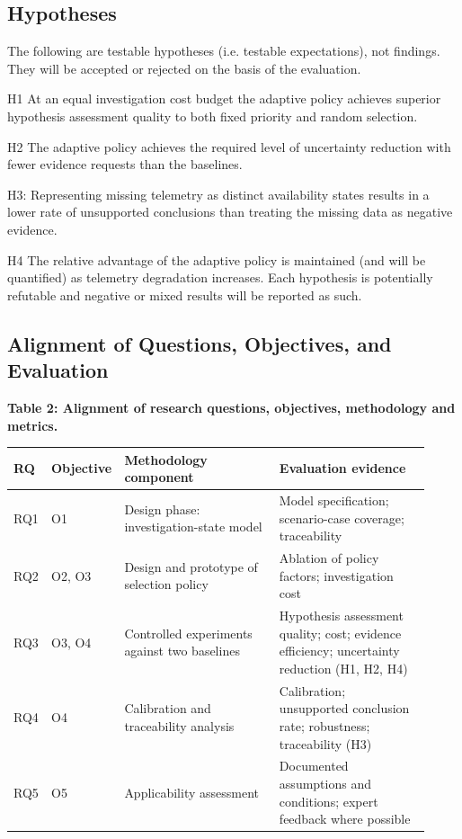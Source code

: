 \documentclass[a4paper,11pt]{article}
\begin{document}
\subsection{Hypotheses}
The following are testable hypotheses (i.e. testable expectations), not findings. They will be accepted or rejected on the basis of the evaluation.\par
H1 At an equal investigation cost budget the adaptive policy achieves superior hypothesis assessment quality to both fixed priority and random selection.\par
H2 The adaptive policy achieves the required level of uncertainty reduction with fewer evidence requests than the baselines.\par
H3: Representing missing telemetry as distinct availability states results in a lower rate of unsupported conclusions than treating the missing data as negative evidence.\par
H4 The relative advantage of the adaptive policy is maintained (and will be quantified) as telemetry degradation increases. Each hypothesis is potentially refutable and negative or mixed results will be reported as such.\par
\subsection{Alignment of Questions, Objectives, and Evaluation}
\par\noindent\textbf{Table 2: Alignment of research questions, objectives, methodology and metrics.}\par
{\footnotesize\setlength{\tabcolsep}{3pt}\renewcommand{\arraystretch}{1.16}
\begin{longtable}{@{}p{0.07\linewidth}p{0.12\linewidth}p{0.37\linewidth}p{0.36\linewidth}@{}}
\toprule
RQ & Objective & Methodology component & Evaluation evidence \\
\midrule\endhead
RQ1 & O1 & Design phase: investigation-state model & Model specification; scenario-case coverage; traceability \\
\addlinespace[3pt]
RQ2 & O2, O3 & Design and prototype of selection policy & Ablation of policy factors; investigation cost \\
\addlinespace[3pt]
RQ3 & O3, O4 & Controlled experiments against two baselines & Hypothesis assessment quality; cost; evidence efficiency; uncertainty reduction (H1, H2, H4) \\
\addlinespace[3pt]
RQ4 & O4 & Calibration and traceability analysis & Calibration; unsupported conclusion rate; robustness; traceability (H3) \\
\addlinespace[3pt]
RQ5 & O5 & Applicability assessment & Documented assumptions and conditions; expert feedback where possible \\
\bottomrule
\end{longtable}
}
\end{document}
